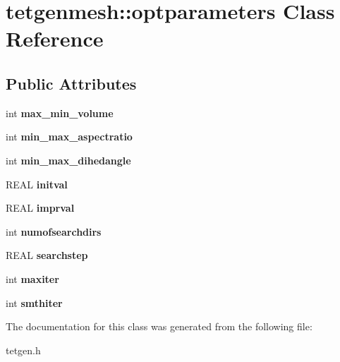 \hypertarget{classtetgenmesh_1_1optparameters}{}\section{tetgenmesh\+:\+:optparameters Class Reference}
\label{classtetgenmesh_1_1optparameters}
\subsection*{Public Attributes}
\begin{DoxyCompactItemize}
\item 
\mbox{\label{classtetgenmesh_1_1optparameters_ac9adc44bb0076f3b2e5c11c0bf831278}} 
int {\bfseries max\+\_\+min\+\_\+volume}
\item 
\mbox{\label{classtetgenmesh_1_1optparameters_a46f41eab69ba54553aa9c25d45f6799a}} 
int {\bfseries min\+\_\+max\+\_\+aspectratio}
\item 
\mbox{\label{classtetgenmesh_1_1optparameters_ab391511f633b84180d0e6cc52510e343}} 
int {\bfseries min\+\_\+max\+\_\+dihedangle}
\item 
\mbox{\label{classtetgenmesh_1_1optparameters_a06ad962f12e69b344f409f6e835d27ec}} 
R\+E\+AL {\bfseries initval}
\item 
\mbox{\label{classtetgenmesh_1_1optparameters_a5415643a8bf717ea781e97d56d725173}} 
R\+E\+AL {\bfseries imprval}
\item 
\mbox{\label{classtetgenmesh_1_1optparameters_af6ea36aeb4f65aa694e3df5c6dcd3a8d}} 
int {\bfseries numofsearchdirs}
\item 
\mbox{\label{classtetgenmesh_1_1optparameters_ace9dd689b3cb7b135573b46fbf6afed2}} 
R\+E\+AL {\bfseries searchstep}
\item 
\mbox{\label{classtetgenmesh_1_1optparameters_a0f2b3bd97f2120bdb77acb9e89026196}} 
int {\bfseries maxiter}
\item 
\mbox{\label{classtetgenmesh_1_1optparameters_a7c01e6bed6c1f6188f7408f84b9644d9}} 
int {\bfseries smthiter}
\end{DoxyCompactItemize}


The documentation for this class was generated from the following file\+:\begin{DoxyCompactItemize}
\item 
tetgen.\+h\end{DoxyCompactItemize}
